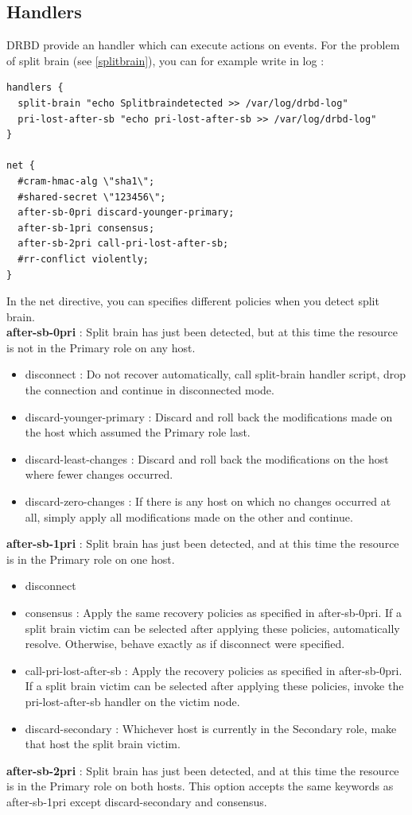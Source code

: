 \documentclass[a4paper,10pt]{report}
\begin{document}
\subsection{Handlers}
DRBD provide an handler which can execute actions on events. For the problem of split brain (see \ref{splitbrain}), you can for example write in log :
\begin{lstlisting}
handlers {
  split-brain "echo Splitbraindetected >> /var/log/drbd-log"
  pri-lost-after-sb "echo pri-lost-after-sb >> /var/log/drbd-log"
}

net {
  #cram-hmac-alg \"sha1\";
  #shared-secret \"123456\";
  after-sb-0pri discard-younger-primary;
  after-sb-1pri consensus;
  after-sb-2pri call-pri-lost-after-sb;
  #rr-conflict violently;
}
\end{lstlisting}
In the net directive, you can specifies different policies when you detect split brain.\\
\textbf{after-sb-0pri} : Split brain has just been detected, but at this time the resource is not in the Primary role on any host.
\begin{itemize}
\item disconnect : Do not recover automatically, call split-brain handler script, drop the connection and continue in disconnected mode.
\item discard-younger-primary : Discard and roll back the modifications made on the host which assumed the Primary role last.
\item discard-least-changes : Discard and roll back the modifications on the host where fewer changes occurred.
\item discard-zero-changes : If there is any host on which no changes occurred at all, simply apply all modifications made on the other and continue.
\end{itemize}
\textbf{after-sb-1pri} : Split brain has just been detected, and at this time the resource is in the Primary role on one host.
\begin{itemize}
\item disconnect 
\item consensus : Apply the same recovery policies as specified in after-sb-0pri. If a split brain victim can be selected after applying these policies, automatically resolve. Otherwise, behave exactly as if disconnect were specified.
\item call-pri-lost-after-sb : Apply the recovery policies as specified in after-sb-0pri. If a split brain victim can be selected after applying these policies, invoke the pri-lost-after-sb handler on the victim node.
\item discard-secondary : Whichever host is currently in the Secondary role, make that host the split brain victim.
\end{itemize}
\textbf{after-sb-2pri} : Split brain has just been detected, and at this time the resource is in the Primary role on both hosts. This option accepts the same keywords as after-sb-1pri except discard-secondary and consensus.
\end{document}

